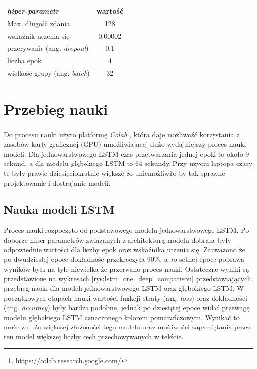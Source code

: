 \begin{table}[t]
\label{tab:parametry_bert}
\centering\footnotesize%
\begin{tabular}{l c}
\toprule
\textit{hiper-parametr} & wartość \\
\midrule
Max. długość zdania   & 128 \\
wskaźnik uczenia się   & 0.00002 \\
przerywanie (ang. \textit{dropout})   & 0.1 \\
liczba epok   & 4 \\
wielkość grupy (ang. \textit{batch}) & 32 \\
\bottomrule
\end{tabular}
\end{table}

\section{Przebieg nauki}

Do procesu nauki użyto platformę \textit{Colab}\footnote{\url{https://colab.research.google.com/}}, która daje możliwość korzystania z zasobów karty graficznej (GPU) umożliwiającej dużo wydajniejszy proces nauki modeli. Dla jednowarstwowego LSTM czas przetwarzania jednej epoki to około 9 sekund, a dla modelu głębokiego LSTM to 64 sekundy. Przy użyciu laptopa czasy te były prawie dziesięciokrotnie większe co uniemożliwiło by tak sprawne projektowanie i dostrajanie modeli.

\subsection{Nauka modeli LSTM}

Proces nauki rozpoczęto od podstawowego modelu jednowarstwowego LSTM. Po doborze hiper-parametrów związanych z architekturą modelu dobrane były odpowiednie wartości dla liczby epok oraz wskaźnika uczenia się. Zauważono że po dwudziestej epoce dokładność przekroczyła 90\%, a po setnej epoce poprawa wyników była na tyle niewielka że przerwano proces nauki. Ostateczne wyniki są przedstawione na wykresach \ref{rys:lstm_one_deep_comparison} przedstawiających przebieg nauki dla modeli jednowarstwowego LSTM oraz głębokiego LSTM. W początkowych etapach nauki wartości funkcji straty (ang. \textit{loss}) oraz dokładności (ang. \textit{accuracy}) były bardzo podobne, jednak po dziesiątej epoce widać przewagę modelu głębokiego LSTM oznaczonego kolorem pomarańczowym. Wynikać to może z dużo większej złożoności tego modelu oraz możliwości zapamiętania przez ten model większej liczby cech przechowywanych w tekście.


